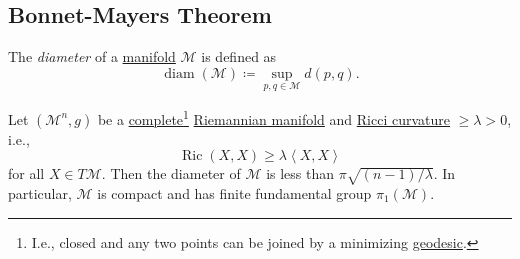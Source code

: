 \subsection{Bonnet-Mayers Theorem}
\begin{definition}[Diameter]\label{def:diameter}
	The \emph{diameter} of a \hyperref[def:smooth-manifold]{manifold} \(\mathcal{M} \) is defined as
	\[
		\mathop{\mathrm{diam}}(\mathcal{M} ) \coloneqq \sup _{p, q\in \mathcal{M} } d(p, q).
	\]
\end{definition}

\begin{theorem}\label{thm:Bonnet-Mayers}
	Let \((\mathcal{M}^n , g)\) be a \hyperref[def:geodesically-complete]{complete}\footnote{I.e., closed and any two points can be joined by a minimizing \hyperref[def:geodesic]{geodesic}.} \hyperref[def:Riemannian-manifold]{Riemannian manifold} and \hyperref[def:Ricci-curvature]{Ricci curvature} \(\geq \lambda > 0\), i.e.,
	\[
		\mathop{\mathrm{Ric}}(X, X) \geq \lambda \left\langle X, X \right\rangle
	\]
	for all \(X\in T\mathcal{M} \). Then the diameter of \(\mathcal{M} \) is less than \(\pi \sqrt{(n - 1) / \lambda } \). In particular, \(\mathcal{M} \) is compact and has finite fundamental group \(\pi _1(\mathcal{M} )\).
\end{theorem}
